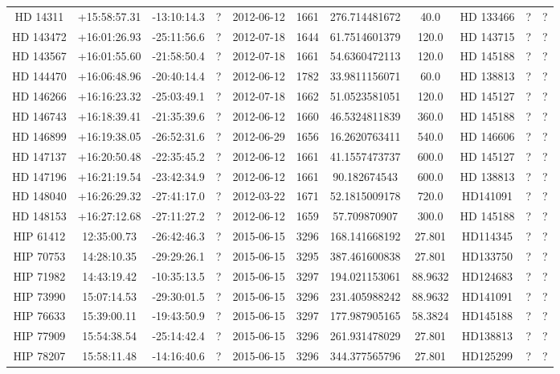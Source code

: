 \begin{table}
\begin{tabular}{ccccccccccc}
HD 14311 & +15:58:57.31 & -13:10:14.3 & ? & 2012-06-12 & 1661 & 276.714481672 & 40.0 & HD 133466 & ? & ? \\
HD 143472 & +16:01:26.93 & -25:11:56.6 & ? & 2012-07-18 & 1644 & 61.7514601379 & 120.0 & HD 143715 & ? & ? \\
HD 143567 & +16:01:55.60 & -21:58:50.4 & ? & 2012-07-18 & 1661 & 54.6360472113 & 120.0 & HD 145188 & ? & ? \\
HD 144470 & +16:06:48.96 & -20:40:14.4 & ? & 2012-06-12 & 1782 & 33.9811156071 & 60.0 & HD 138813 & ? & ? \\
HD 146266 & +16:16:23.32 & -25:03:49.1 & ? & 2012-07-18 & 1662 & 51.0523581051 & 120.0 & HD 145127 & ? & ? \\
HD 146743 & +16:18:39.41 & -21:35:39.6 & ? & 2012-06-12 & 1660 & 46.5324811839 & 360.0 & HD 145188 & ? & ? \\
HD 146899 & +16:19:38.05 & -26:52:31.6 & ? & 2012-06-29 & 1656 & 16.2620763411 & 540.0 & HD 146606 & ? & ? \\
HD 147137 & +16:20:50.48 & -22:35:45.2 & ? & 2012-06-12 & 1661 & 41.1557473737 & 600.0 & HD 145127 & ? & ? \\
HD 147196 & +16:21:19.54 & -23:42:34.9 & ? & 2012-06-12 & 1661 & 90.182674543 & 600.0 & HD 138813 & ? & ? \\
HD 148040 & +16:26:29.32 & -27:41:17.0 & ? & 2012-03-22 & 1671 & 52.1815009178 & 720.0 & HD141091 & ? & ? \\
HD 148153 & +16:27:12.68 & -27:11:27.2 & ? & 2012-06-12 & 1659 & 57.709870907 & 300.0 & HD 145188 & ? & ? \\
HIP 61412 & 12:35:00.73 & -26:42:46.3 & ? & 2015-06-15 & 3296 & 168.141668192 & 27.801 & HD114345 & ? & ? \\
HIP 70753 & 14:28:10.35 & -29:29:26.1 & ? & 2015-06-15 & 3295 & 387.461600838 & 27.801 & HD133750 & ? & ? \\
HIP 71982 & 14:43:19.42 & -10:35:13.5 & ? & 2015-06-15 & 3297 & 194.021153061 & 88.9632 & HD124683 & ? & ? \\
HIP 73990 & 15:07:14.53 & -29:30:01.5 & ? & 2015-06-15 & 3296 & 231.405988242 & 88.9632 & HD141091 & ? & ? \\
HIP 76633 & 15:39:00.11 & -19:43:50.9 & ? & 2015-06-15 & 3297 & 177.987905165 & 58.3824 & HD145188 & ? & ? \\
HIP 77909 & 15:54:38.54 & -25:14:42.4 & ? & 2015-06-15 & 3296 & 261.931478029 & 27.801 & HD138813 & ? & ? \\
HIP 78207 & 15:58:11.48 & -14:16:40.6 & ? & 2015-06-15 & 3296 & 344.377565796 & 27.801 & HD125299 & ? & ? \\

\end{tabular}
\end{table}
